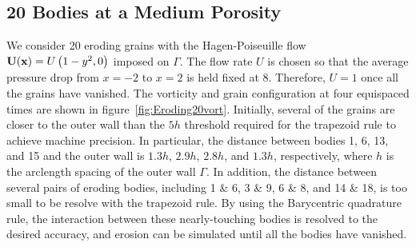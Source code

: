 \documentclass{jfm}
\begin{document}
\subsection{20 Bodies at a Medium Porosity}
\label{sec:Eroding20}
We consider 20 eroding grains with the Hagen-Poiseuille flow ${\mathbf{U}}({\mathbf{x}}) =
U \left(1-y^2,0 \right)$
imposed on $\Gamma$. The flow rate $U$ is chosen so that the average
pressure drop from $x=-2$ to $x=2$ is held fixed at 8. Therefore, $U=1$
once all the grains have vanished.  The vorticity and grain
configuration at four equispaced times are shown in
figure~\ref{fig:Eroding20vort}.  Initially, several of the grains are
closer to the outer wall than the $5h$ threshold required for the
trapezoid rule to achieve machine precision.  In particular, the
distance between bodies 1, 6, 13, and 15 and the outer wall is $1.3h$,
$2.9h$, $2.8h$, and $1.3h$, respectively, where $h$ is the arclength
spacing of the outer wall $\Gamma$.  In addition, the distance between
several pairs of eroding bodies, including 1 \& 6, 3 \& 9, 6 \& 8, and
14 \& 18, is too small to be resolve with the trapezoid rule.  By using
the Barycentric quadrature rule, the interaction between these
nearly-touching bodies is resolved to the desired accuracy, and erosion
can be simulated until all the bodies have vanished.
\end{document}
